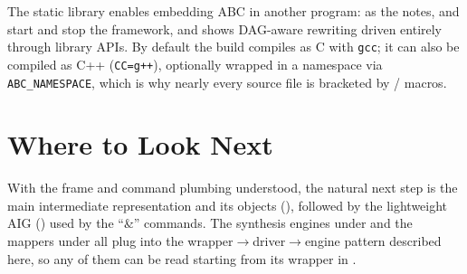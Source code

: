 The static library enables embedding ABC in another program: as the
 notes,  and  start and stop the
framework, and  shows DAG-aware rewriting driven entirely
through library APIs. By default the build compiles as C with \texttt{gcc}; it
can also be compiled as C++ (\texttt{CC=g++}), optionally wrapped in a namespace
via \texttt{ABC\_NAMESPACE}, which is why nearly every source file is bracketed
by / macros.

\section{Where to Look Next}

With the frame and command plumbing understood, the natural next step is the
main intermediate representation  and its objects
(), followed by the lightweight AIG 
() used by the ``\&'' commands. The synthesis engines under
 and the mappers under  all plug into the
wrapper$\to$driver$\to$engine pattern described here, so any of them can be read
starting from its  wrapper in .
